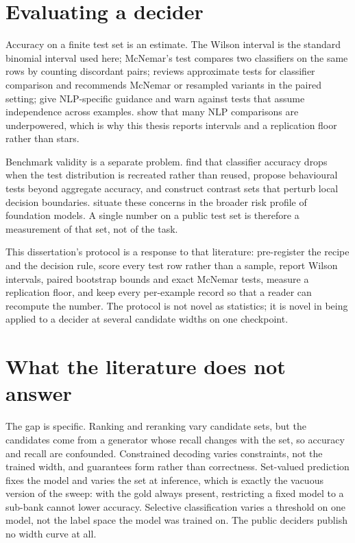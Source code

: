\section{Evaluating a decider}

Accuracy on a finite test set is an estimate. The Wilson interval
\citep{wilson1927} is the standard binomial interval used here; McNemar's test
\citep{mcnemar1947} compares two classifiers on the same rows by counting
discordant pairs; \citet{dietterich1998} reviews approximate tests for classifier
comparison and recommends McNemar or resampled variants in the paired setting;
\citet{dror2018} give NLP-specific guidance and warn against tests that assume
independence across examples. \citet{card2020power} show that many NLP comparisons
are underpowered, which is why this thesis reports intervals and a replication
floor rather than stars.

Benchmark validity is a separate problem. \citet{recht2019imagenet} find that
classifier accuracy drops when the test distribution is recreated rather than
reused, \citet{ribeiro2020checklist} propose behavioural tests beyond aggregate
accuracy, and \citet{gardner2020contrast} construct contrast sets that perturb
local decision boundaries. \citet{bommasani2021foundation} situate these concerns
in the broader risk profile of foundation models. A single number on a public
test set is therefore a measurement of that set, not of the task.

This dissertation's protocol is a response to that literature: pre-register the
recipe and the decision rule, score every test row rather than a sample, report
Wilson intervals, paired bootstrap bounds and exact McNemar tests, measure a
replication floor, and keep every per-example record so that a reader can
recompute the number. The protocol is not novel as statistics; it is novel in
being applied to a decider at several candidate widths on one checkpoint.

\section{What the literature does not answer}

The gap is specific. Ranking and reranking vary candidate sets, but the candidates
come from a generator whose recall changes with the set, so accuracy and recall
are confounded. Constrained decoding varies constraints, not the trained width,
and guarantees form rather than correctness. Set-valued prediction fixes the
model and varies the set at inference, which is exactly the vacuous version of
the sweep: with the gold always present, restricting a fixed model to a sub-bank
cannot lower accuracy. Selective classification varies a threshold on one model,
not the label space the model was trained on. The public deciders publish no
width curve at all.

